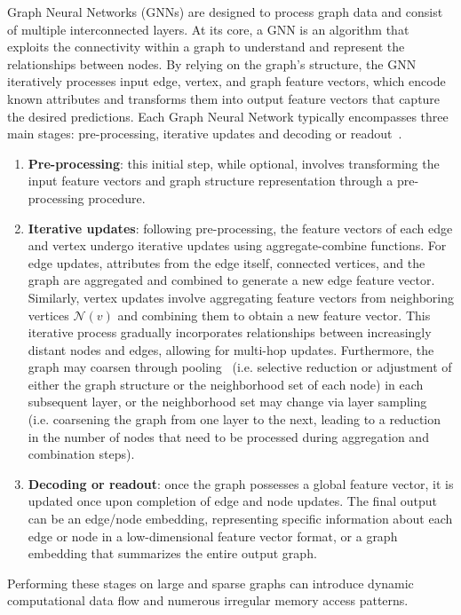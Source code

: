 Graph Neural Networks (GNNs) are designed to process graph data and consist of multiple interconnected layers.
At its core, a GNN is an algorithm that exploits the connectivity within a graph to understand and represent the relationships between nodes.
By relying on the graph's structure, the GNN iteratively processes input edge, vertex, and graph feature vectors, which encode known attributes and transforms them into output feature vectors that capture the desired predictions.
Each Graph Neural Network typically encompasses three main stages: pre-processing, iterative updates and decoding or readout~\cite{DBLP:journals/corr/abs-2010-00130}.
\begin{enumerate}
    \item \textbf{Pre-processing}: this initial step, while optional, involves transforming the input feature vectors and graph structure representation through a pre-processing procedure.
    \item \textbf{Iterative updates}: following pre-processing, the feature vectors of each edge and vertex undergo iterative updates using aggregate-combine functions.
          For edge updates, attributes from the edge itself, connected vertices, and the graph are aggregated and combined to generate a new edge feature vector.
          Similarly, vertex updates involve aggregating feature vectors from neighboring vertices $\mathcal{N}(v)$ and combining them to obtain a new feature vector.
          This iterative process gradually incorporates relationships between increasingly distant nodes and edges, allowing for multi-hop updates.
          Furthermore, the graph may coarsen through pooling~\cite{DBLP:journals/corr/abs-1806-08804} (i.e. selective reduction or adjustment of either the graph structure or the neighborhood set of each node) in each subsequent layer, or the neighborhood set may change via layer sampling~\cite{DBLP:journals/corr/HamiltonYL17} (i.e. coarsening the graph from one layer to the next, leading to a reduction in the number of nodes that need to be processed during aggregation and combination steps).
    \item \textbf{Decoding or readout}: once the graph possesses a global feature vector, it is updated once upon completion of edge and node updates.
          The final output can be an edge/node embedding, representing specific information about each edge or node in a low-dimensional feature vector format, or a graph embedding that summarizes the entire output graph.
\end{enumerate}
Performing these stages on large and sparse graphs can introduce dynamic computational data flow and numerous irregular memory access patterns.

